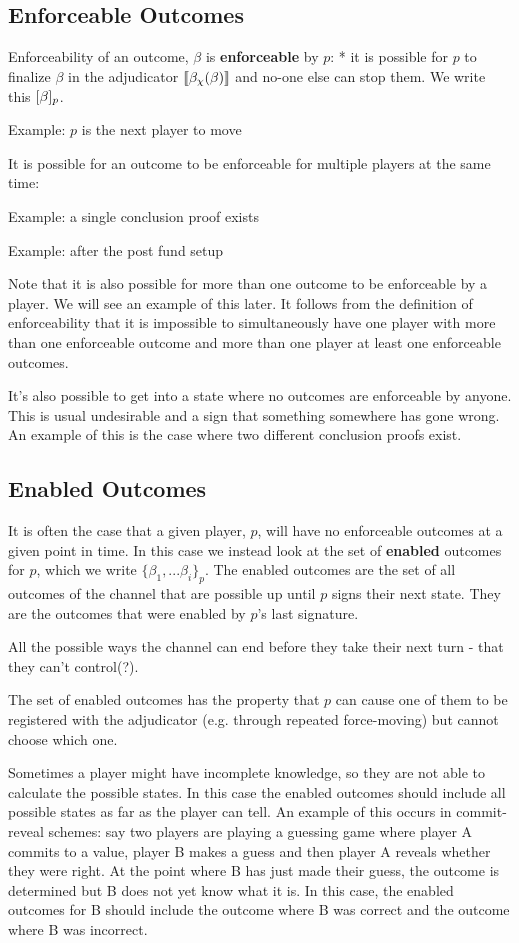 \subsection{Enforceable Outcomes}

Enforceability of an outcome, $\beta$ is \textbf{enforceable} by $p$:
* it is possible for $p$ to finalize $\beta$ in the adjudicator $\llbracket \beta_\chi(\beta) \rrbracket$ and no-one else can stop them. We write this $[\beta]_p$.

Example: $p$ is the next player to move

It is possible for an outcome to be enforceable for multiple players at the same time:

Example: a single conclusion proof exists

Example: after the post fund setup

Note that it is also possible for more than one outcome to be enforceable by a player. We will see an example of this later. It follows from the definition of enforceability that it is impossible to simultaneously have one player with more than one enforceable outcome and more than one player at least one enforceable outcomes. 

It's also possible to get into a state where no outcomes are enforceable by anyone. This is usual undesirable and a sign that something somewhere has gone wrong. An example of this is the case where two different conclusion proofs exist.


\subsection{Enabled Outcomes}

It is often the case that a given player, $p$, will have no enforceable outcomes at a given point in time. In this case we instead look at the set of \textbf{enabled} outcomes for $p$, which we write $\{\beta_1, ... \beta_i\}_p$. The enabled outcomes are the set of all outcomes of the channel that are possible up until $p$ signs their next state. They are the outcomes that were enabled by $p$'s last signature.

All the possible ways the channel can end before they take their next turn - that they can't control(?).

The set of enabled outcomes has the property that $p$ can cause one of them to be registered with the adjudicator (e.g. through repeated force-moving) but cannot choose which one.

Sometimes a player might have incomplete knowledge, so they are not able to calculate the possible states. In this case the enabled outcomes should include all possible states as far as the player can tell. An example of this occurs in commit-reveal schemes: say two players are playing a guessing game where player A commits to a value, player B makes a guess and then player A reveals whether they were right. At the point where B has just made their guess, the outcome is determined but B does not yet know what it is. In this case, the enabled outcomes for B should include the outcome where B was correct and the outcome where B was incorrect.

